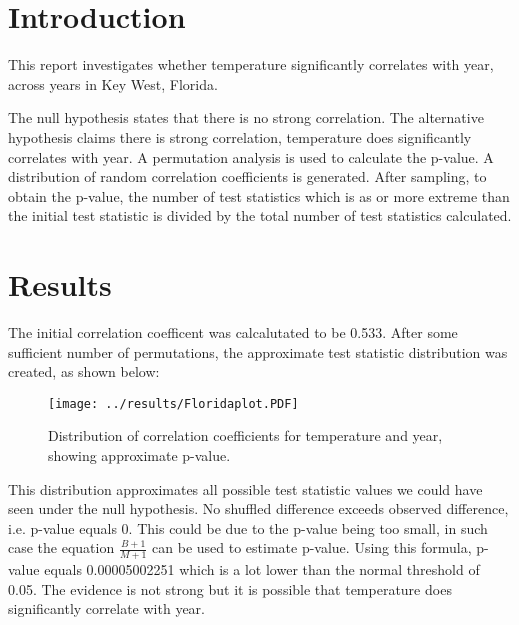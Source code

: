 \documentclass[11pt]{article}
\title{\vspace{-1.5cm}{Is Florida getting warmer?}}
\author{An Nguyen}
\date{\today}
\begin{document}
\maketitle

\section{Introduction}
This report investigates whether temperature significantly correlates with year, across years in Key West, Florida. 

The null hypothesis states that there is no strong correlation. The alternative hypothesis claims there is strong correlation, temperature does significantly correlates with year. A permutation analysis is used to calculate the p-value. A distribution of random correlation coefficients is generated. After sampling, to obtain the p-value, the number of test statistics which is as or more extreme than the initial test statistic is divided by the total number of test statistics calculated.

\section{Results}
The initial correlation coefficent was calcalutated to be 0.533. After some sufficient number of permutations, the approximate test statistic distribution was created, as shown below: 

\begin{figure}[H]
\texttt{[image: ../results/Floridaplot.PDF]}
\centering
\caption{Distribution of correlation coefficients for temperature and year, showing approximate p-value.}
\end{figure}

This distribution approximates all possible test statistic values we could have seen under the null hypothesis. No shuffled difference exceeds observed difference, i.e. p-value equals 0. This could be due to the p-value being too small, in such case the equation $\frac{B+1}{M+1}$ can be used to estimate p-value. Using this formula, p-value equals 0.00005002251 which is a lot lower than the normal threshold of 0.05. The evidence is not strong but it is possible that temperature does significantly correlate with year. 
\end{document}
